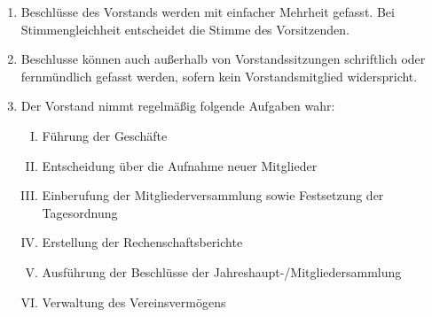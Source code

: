 \documentclass[12pt,a4paper,titlepage]{scrartcl}
\begin{document}
\begin{enumerate}
\item Beschlüsse des Vorstands werden mit einfacher Mehrheit gefasst. Bei Stimmengleichheit entscheidet die Stimme des Vorsitzenden.
\item Beschlusse können auch außerhalb von Vorstandssitzungen schriftlich oder fernmündlich
gefasst werden, sofern kein Vorstandsmitglied widerspricht.
\item Der Vorstand nimmt regelmäßig folgende Aufgaben wahr:
\begin{enumerate}[I.]
\item Führung der Geschäfte
\item Entscheidung über die Aufnahme neuer Mitglieder
\item Einberufung der Mitgliederversammlung sowie Festsetzung der Tagesordnung
\item Erstellung der Rechenschaftsberichte
\item Ausführung der Beschlüsse der Jahreshaupt-/Mitgliedersammlung
\item Verwaltung des Vereinsvermögens
\end{enumerate}
\end{enumerate}
\end{document}
